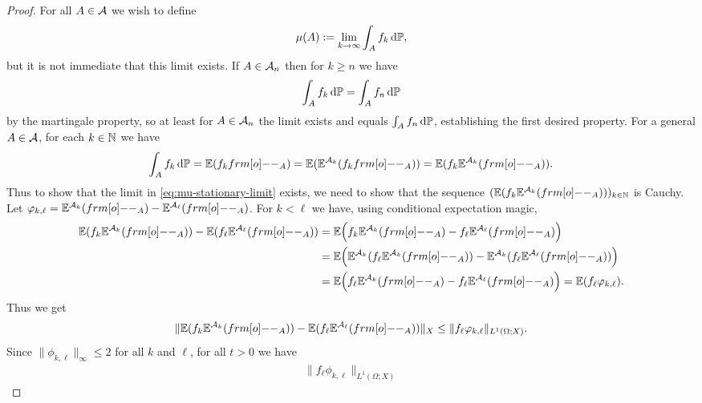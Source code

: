 \begin{proof}
  For all $A \in \mathcal{A}$ we wish to define
  \begin{equation}\label{eq:mu-stationary-limit}
    \mu(A) := \lim_{k \to \infty} \int_A f_k \, \mathrm{d}\mathbb{P},
  \end{equation}
  but it is not immediate that this limit exists.
  If $A \in \mathcal{A}_{n}$ then for $k \geq n$ we have
  \begin{equation*}
    \int_A f_k \, \mathrm{d}\mathbb{P} = \int_A f_n \, \mathrm{d} \mathbb{P}
  \end{equation*}
  by the martingale property, so at least for $A \in \mathcal{A}_{n}$ the limit exists and equals $\int_A f_n \, \mathrm{d}\mathbb{P}$, establishing the first desired property.
  For a general $A \in \mathcal{A}$, for each $k \in \mathbb{N}$ we have
  \begin{equation*}
     \int_A f_k \, \dd\P = \E(f_k \1_{A}) = \E(\E^{\mc{A}_k}(f_k \1_{A})) = \E(f_k \E^{\mc{A}_k}(\1_{A})).
   \end{equation*}
   Thus to show that the limit in \eqref{eq:mu-stationary-limit} exists, we need to show that the sequence $(\E(f_k \E^{\mc{A}_k}( \1_{A})))_{k \in \N}$ is Cauchy.
   Let $\phi_{k,\ell} = \E^{\mc{A}_k}(\1_{A}) - \E^{\mc{A}_\ell}( \1_{A})$.
   For $k < \ell$ we have, using conditional expectation magic,
   \begin{equation*}
     \begin{aligned}
       \E(f_k \E^{\mc{A}_k}(\1_{A})) - \E(f_\ell \E^{\mc{A}_\ell}( \1_{A}))
       &= \E \Big( f_k \E^{\mc{A}_k}(\1_{A}) - f_{\ell} \E^{\mc{A}_\ell}( \1_{A})\Big) \\
       &= \E \Big(  \E^{\mc{A}_{k}}(f_\ell \E^{\mc{A}_k}(\1_{A})) - \E^{\mc{A}_{k}}(f_{\ell} \E^{\mc{A}_\ell}( \1_{A}) )\Big) \\
       &= \E \Big(  f_\ell \E^{\mc{A}_k}(\1_{A}) - f_{\ell} \E^{\mc{A}_\ell}( \1_{A}) \Big) 
       = \E (  f_\ell \phi_{k,\ell}).
     \end{aligned}
   \end{equation*}
   Thus we get
   \begin{equation*}
     \|\E(f_k \E^{\mc{A}_k}(\1_{A})) - \E(f_\ell \E^{\mc{A}_\ell}( \1_{A}))\|_{X}
     \leq \|f_\ell \phi_{k,\ell}\|_{L^1(\Omega;X)}.
   \end{equation*}
   Since $\|\phi_{k,\ell}\|_\infty \leq 2$ for all $k$ and $\ell$, for all $t > 0$ we have
   \begin{equation*}
     \begin{aligned}
       \|  f_\ell \phi_{k,\ell} \|_{L^1(\Omega;X)}

\end{aligned}
\end{equation*}
\end{proof}
